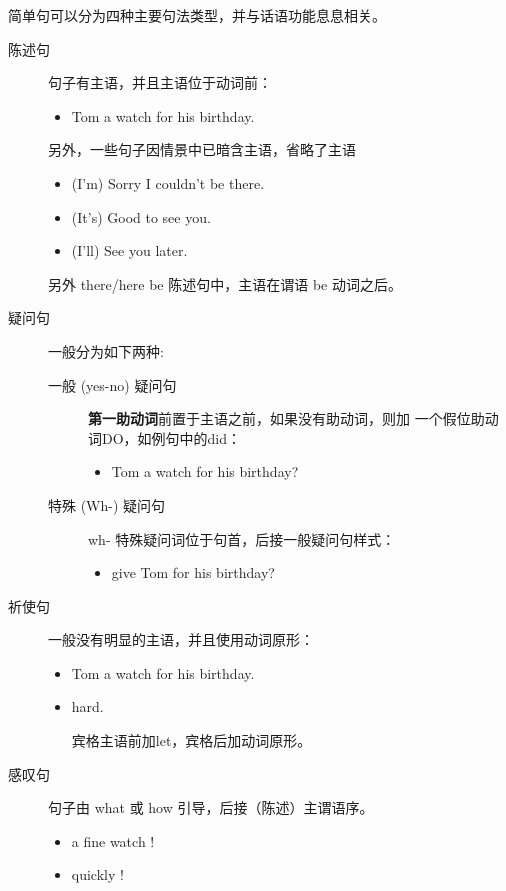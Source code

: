 简单句可以分为四种主要句法类型，并与话语功能息息相关。
\begin{description}
\item[陈述句] 句子有主语，并且主语位于动词前：
  \begin{itemize}
  \item {}  Tom a watch for his birthday.
  \end{itemize}

  另外，一些句子因情景中已暗含主语，省略了主语
  \begin{itemize}
  \item (I'm) Sorry I couldn't be there.

  \item (It's) Good to see you.
  \item (I'll) See you later.
  \end{itemize}

  另外 there/here be 陈述句中，主语在谓语 be 动词之后。

\item [疑问句] 一般分为如下两种:
  \begin{description}
  \item [一般 (yes-no) 疑问句] \textbf{第一助动词}前置于主语之前，如果没有助动词，则加
    一个假位助动词DO，如例句中的did：
    \begin{itemize}
    \item {}   Tom a watch for his birthday?
    \end{itemize}

  \item [特殊 (Wh-) 疑问句] wh- 特殊疑问词位于句首，后接一般疑问句样式：
    \begin{itemize}
    \item {}   give Tom for his birthday?
    \end{itemize}
  \end{description}

\item[祈使句] 一般没有明显的主语，并且使用动词原形：
  \begin{itemize}
  \item {} Tom a watch for his birthday.

  \item {}  hard.

    宾格主语前加let，宾格后加动词原形。
  \end{itemize}


\item[感叹句] 句子由 what 或 how 引导，后接（陈述）主谓语序。
  \begin{itemize}
  \item {} a fine watch !

  \item {} quickly !
  \end{itemize}
\end{description}

